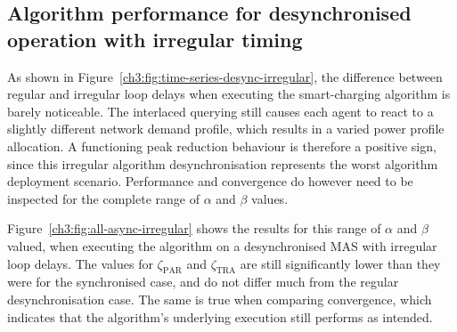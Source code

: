 \subsection{Algorithm performance for desynchronised operation with irregular timing}
\label{ch3:subsec:algorithm-performance-desynchronised-irregular}



As shown in Figure~\ref{ch3:fig:time-series-desync-irregular}, the difference between regular and irregular loop delays when executing the smart-charging algorithm is barely noticeable.
The interlaced querying still causes each agent to react to a slightly different network demand profile, which results in a varied power profile allocation.
A functioning peak reduction behaviour is therefore a positive sign, since this irregular algorithm desynchronisation represents the worst algorithm deployment scenario.
Performance and convergence do however need to be inspected for the complete range of $\alpha$ and $\beta$ values.



Figure~\ref{ch3:fig:all-async-irregular} shows the results for this range of $\alpha$ and $\beta$ valued, when executing the algorithm on a desynchronised MAS with irregular loop delays.
The values for $\zeta_\text{PAR}$ and $\zeta_\text{TRA}$ are still significantly lower than they were for the synchronised case, and do not differ much from the regular desynchronisation case.
The same is true when comparing convergence, which indicates that the algorithm's underlying execution still performs as intended.



